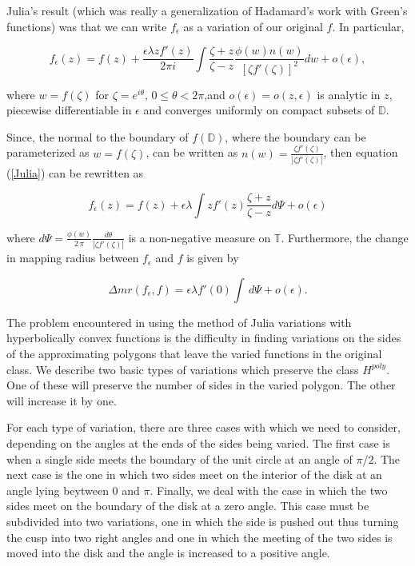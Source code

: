 \documentclass[final]{siamltex}
\newcommand{\dsp}{\displaystyle}
\newcommand{\T}{\mathbb{T}}
\newcommand{\D}{\mathbb{D}}
\newcommand{\eps}{\epsilon}
\begin{document}
Julia's result (which was really a generalization of Hadamard's work with Green's functions) was that we can write ${f_{\eps}}$ as a variation of our original $f$. In particular,

\begin{equation}
\label{Julia} {f_{\eps}}(z) = f(z) + \frac{\eps  \lambda zf'(z)}{2\pi i}\int\frac{\zeta + z}{\zeta -z} \frac{\phi (w) n(w)}{\left[ \zeta f'( \zeta ) \right]^2}dw + o(\eps),
\end{equation}

\noindent where $w = f(\zeta)$ for $\zeta = e^{i\theta},\, 0\leq \theta < 2\pi$,and $o(\eps)= o(z,\eps)$ is analytic in $z$, piecewise differentiable in $\eps$ and converges uniformly on compact subsets of $\D$. 

Since, the normal to the boundary of $f(\D)$, where the boundary can be parameterized as $w = f(\zeta)$, can be written as $n(w) = \frac{\zeta f'(\zeta)}{|\zeta f'(\zeta)|}$, then equation (\ref{Julia}) can be rewritten as 

\begin{equation}
\label{Julia1} {f_{\eps}}(z) = f(z) + \eps \lambda \int zf'(z)\frac{\zeta + z}{\zeta -z} d\Psi + o(\eps)
\end{equation}

\noindent where ${\dsp d\Psi = \frac{\phi(w)}{2\,\pi} \frac{d\theta}{|\zeta f'(\zeta)|}}$ is a non-negative measure on $\T$.  Furthermore, the change in mapping radius between $f_{\eps}$ and $f$ is given by

\begin{equation}\label{changemr}
\Delta mr(f_{\eps},f) =
 \eps \lambda f'(0) \int \,d\Psi  +o(\eps).
\end{equation}


The problem encountered in using the method of Julia variations with hyperbolically convex functions is  the difficulty in finding variations on the sides of the approximating polygons that leave the varied functions in the original class.  We describe two basic types of variations which preserve the class $H^{poly}$.  One of these will preserve the number of sides in the varied polygon.  The other will increase it by one.   

For each type of variation, there are three cases with which we need to consider, depending on the angles at the ends of the sides being varied.  The first case is when a single side meets the boundary of the unit circle at an angle of $\pi/2.$  The next case is the one in which two sides meet on the interior of the disk at an angle lying beytween $0$ and $\pi$.  Finally, we deal with the case in which the two sides meet on the boundary of the disk at a zero angle.  This case must be subdivided into two variations, one in which the side is pushed out thus turning the cusp into two right angles and one in which the meeting of the two sides is moved into the disk and the angle is increased to a positive angle. 
\end{document}
